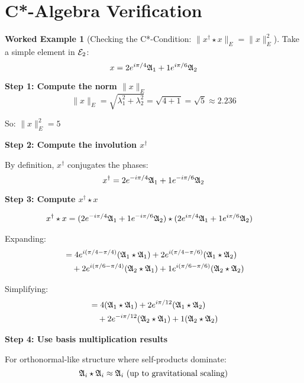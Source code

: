 \documentclass[12pt,a4paper]{article}
\theoremstyle{definition}
\newtheorem{example}{Worked Example}[section]
\theoremstyle{remark}
\begin{document}
\newpage
\section{C*-Algebra Verification}

\begin{example}[Checking the C*-Condition: $\|x^{\dagger} \star x\|_E = \|x\|_E^2$]

Take a simple element in $\mathcal{E}_{2}$:
$$x = 2e^{i\pi/4} \mathfrak{A}_{1} + 1e^{i\pi/6} \mathfrak{A}_{2}$$

\textbf{Step 1: Compute the norm $\|x\|_E$}
$$\|x\|_E = \sqrt{\lambda_1^2 + \lambda_2^2} = \sqrt{4 + 1} = \sqrt{5} \approx 2.236$$

So: $\|x\|_E^2 = 5$

\textbf{Step 2: Compute the involution $x^{\dagger}$}

By definition, $x^{\dagger}$ conjugates the phases:
$$x^{\dagger} = 2e^{-i\pi/4} \mathfrak{A}_{1} + 1e^{-i\pi/6} \mathfrak{A}_{2}$$

\textbf{Step 3: Compute $x^{\dagger} \star x$}

\begin{align}
x^{\dagger} \star x &= (2e^{-i\pi/4} \mathfrak{A}_{1} + 1e^{-i\pi/6} \mathfrak{A}_{2}) \star (2e^{i\pi/4} \mathfrak{A}_{1} + 1e^{i\pi/6} \mathfrak{A}_{2})
\end{align}

Expanding:
\begin{align}
&= 4e^{i(\pi/4 - \pi/4)}(\mathfrak{A}_{1} \star \mathfrak{A}_{1}) + 2e^{i(\pi/4 - \pi/6)}(\mathfrak{A}_{1} \star \mathfrak{A}_{2}) \\
&\quad + 2e^{i(\pi/6 - \pi/4)}(\mathfrak{A}_{2} \star \mathfrak{A}_{1}) + 1e^{i(\pi/6 - \pi/6)}(\mathfrak{A}_{2} \star \mathfrak{A}_{2})
\end{align}

Simplifying:
\begin{align}
&= 4(\mathfrak{A}_{1} \star \mathfrak{A}_{1}) + 2e^{i\pi/12}(\mathfrak{A}_{1} \star \mathfrak{A}_{2}) \\
&\quad + 2e^{-i\pi/12}(\mathfrak{A}_{2} \star \mathfrak{A}_{1}) + 1(\mathfrak{A}_{2} \star \mathfrak{A}_{2})
\end{align}

\textbf{Step 4: Use basis multiplication results}

For orthonormal-like structure where self-products dominate:
$$\mathfrak{A}_{i} \star \mathfrak{A}_{i} \approx \mathfrak{A}_{i} \text{ (up to gravitational scaling)}$$


\end{example}
\end{document}
